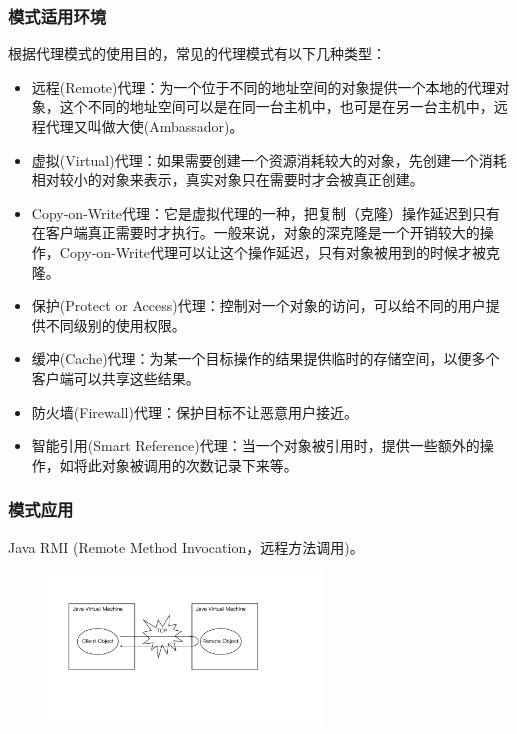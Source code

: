 \subsubsection{模式适用环境}
根据代理模式的使用目的，常见的代理模式有以下几种类型：
\begin{itemize}
    \item 远程(Remote)代理：为一个位于不同的地址空间的对象提供一个本地的代理对象，这个不同的地址空间可以是在同一台主机中，也可是在另一台主机中，远程代理又叫做大使(Ambassador)。
    \item 虚拟(Virtual)代理：如果需要创建一个资源消耗较大的对象，先创建一个消耗相对较小的对象来表示，真实对象只在需要时才会被真正创建。
    \item Copy-on-Write代理：它是虚拟代理的一种，把复制（克隆）操作延迟到只有在客户端真正需要时才执行。一般来说，对象的深克隆是一个开销较大的操作，Copy-on-Write代理可以让这个操作延迟，只有对象被用到的时候才被克隆。
    \item 保护(Protect or Access)代理：控制对一个对象的访问，可以给不同的用户提供不同级别的使用权限。
    \item 缓冲(Cache)代理：为某一个目标操作的结果提供临时的存储空间，以便多个客户端可以共享这些结果。
    \item 防火墙(Firewall)代理：保护目标不让恶意用户接近。
    \item 智能引用(Smart Reference)代理：当一个对象被引用时，提供一些额外的操作，如将此对象被调用的次数记录下来等。
\end{itemize}

\subsubsection{模式应用}
 Java RMI (Remote Method Invocation，远程方法调用)。
\begin{figure}[H]
    \vspace{-0.5em}
	\centering
	\includegraphics[width=0.65\textwidth]{images/代理模式应用.pdf}
    \vspace{-1em}
\end{figure}

